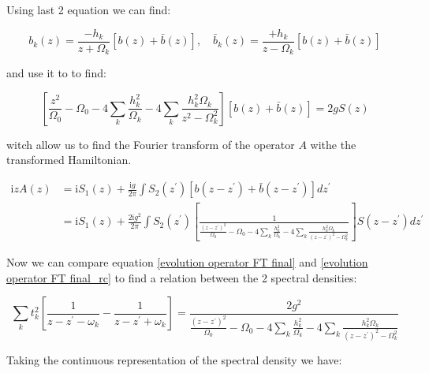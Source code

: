 \documentclass[%
preprint,
onecolumn,
notitlepag,
 amsmath,amssymb,
 aps,
 pra,
]{revtex4-2}
\begin{document}
\begin{itemize}
Using last 2 equation we can find:

\begin{equation}
b_{k}(z)=\frac{-h_{k}}{z+\Omega_{k}}[b(z)+\bar{b}(z)], \quad \bar{b}_{k}(z)=\frac{+h_{k}}{z-\Omega_{k}}[b(z)+\bar{b}(z)]
\end{equation}


and use it to to find: 


\begin{equation}
\left[\frac{z^{2}}{\Omega_{0}}-\Omega_{0}-4 \sum_{k} \frac{h_{k}^{2}}{\Omega_{k}}-4 \sum_{k} \frac{h_{k}^{2} \Omega_{k}}{z^{2}-\Omega_{k}^{2}}\right][b(z)+\bar{b}(z)]=2 g S(z)
\end{equation}


witch allow us to find the Fourier transform of the operator $A$ withe the transformed Hamiltonian. 

\begin{equation}
\begin{aligned}
 \mathrm{i} z A(z) &=\mathrm{i} S_{1}(z)+\frac{\mathrm{i} g}{2 \pi} \int S_{2}\left(z^{\prime}\right)\left[b\left(z-z^{\prime}\right)+\bar{b}\left(z-z^{\prime}\right)\right] d z^{\prime} \\
&=\mathrm{i}  S_{1}(z)+\frac{2 \mathrm{i} g^{2}}{2 \pi} \int S_{2}\left(z^{\prime}\right)\left[\frac{1}{\frac{\left(z-z^{\prime}\right)^{2}}{\Omega_{0}}-\Omega_{0}-4 \sum_{k} \frac{h_{k}^{2}}{\Omega_{k}}-4 \sum_{k} \frac{h_{k}^{2} \Omega_{k}}{\left(z-z^{\prime}\right)^{2}-\Omega_{k}^{2}}}\right] S\left(z-z^{\prime}\right) d z^{\prime}
\end{aligned}
\label{evolution operator FT final_rc}
\end{equation}



Now we can compare equation \eqref{evolution operator FT final} and  \eqref{evolution operator FT final_rc}  to find a relation between the 2 spectral densities: 

\begin{equation}
\sum_{k} t_{k}^{2}\left[\frac{1}{z-z^{\prime}-\omega_{k}}-\frac{1}{z-z^{\prime}+\omega_{k}}\right]=\frac{2 g^{2}}{\frac{\left(z-z^{\prime}\right)^{2}}{\Omega_{0}}-\Omega_{0}-4 \sum_{k} \frac{h_{k}^{2}}{\Omega_{k}}-4 \sum_{k} \frac{h_{k}^{2} \Omega_{k}}{\left(z-z^{\prime}\right)^{2}-\Omega_{k}^{2}}}
\end{equation}



Taking the continuous representation of the spectral density we have:


\end{itemize}
\end{document}
